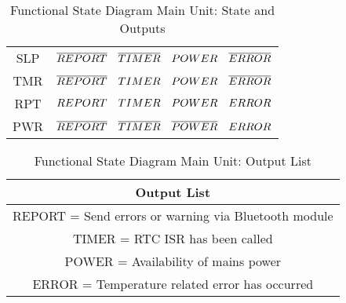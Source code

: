 \begin{center}
\begin{table}[h!]
\begin{tabular}{c|c}
    SLP&$\overline{REPORT}\hbox{  }\hbox{  }\hbox{  }\overline{TIMER}\hbox{  }\hbox{  }\hbox{  }POWER\hbox{ }\hbox{  }\hbox{  }\overline{ERROR}$\\
    TMR&$\overline{REPORT}\hbox{  }\hbox{  }\hbox{  }TIMER\hbox{  }\hbox{  }\hbox{  }POWER\hbox{ }\hbox{  }\hbox{  }\overline{ERROR}$\\
    RPT&$REPORT\hbox{  }\hbox{  }\hbox{  }TIMER\hbox{  }\hbox{  }\hbox{  }POWER\hbox{ }\hbox{  }\hbox{  }ERROR$\\
    PWR&$\overline{REPORT}\hbox{  }\hbox{  }\hbox{  }\overline{TIMER}\hbox{  }\hbox{  }\hbox{  }\overline{POWER}\hbox{ }\hbox{  }\hbox{  }ERROR$\\
  \end{tabular}
  \caption{Functional State Diagram Main Unit: State and Outputs}
  \label{fig:fsd-main-state-outputs}
\end{table}
\begin{table}[h!]
  \begin{tabular}{|c|}
    \hline
    Output List\\
    \hline
    REPORT = Send errors or warning via Bluetooth module\\
    TIMER = RTC ISR has been called\\
    POWER = Availability of mains power\\
    ERROR = Temperature related error has occurred\\
    \hline
  \end{tabular}
  \caption{Functional State Diagram Main Unit: Output List}
  \label{fig:fsd-main-output-list}
\end{table}
\end{center}
